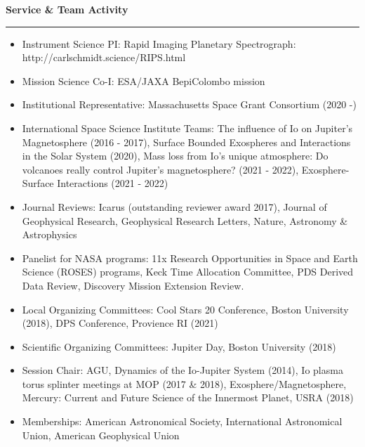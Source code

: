 \documentclass[12pt]{report}
\begin{document}
\noindent\bf{Service \& Team Activity}\rm \hspace*{\fill} \\
\rule{\textwidth}{1pt}
\begin{itemize} \itemsep -2pt %
  \item Instrument Science PI: Rapid Imaging Planetary Spectrograph: http://carlschmidt.science/RIPS.html
  \item Mission Science Co-I: ESA/JAXA BepiColombo mission
  \item Institutional Representative: Massachusetts Space Grant Consortium (2020 -)
  \item International Space Science Institute Teams: The influence of Io on Jupiter's Magnetosphere (2016 - 2017), Surface Bounded Exospheres and Interactions in the Solar System (2020), Mass loss from Io’s unique atmosphere: Do volcanoes really control Jupiter’s magnetosphere? (2021 - 2022), Exosphere-Surface Interactions (2021 - 2022)
  \item Journal Reviews: Icarus (outstanding reviewer award 2017), Journal of Geophysical Research, Geophysical Research Letters, Nature, Astronomy \& Astrophysics
  \item Panelist for NASA programs: 11x Research Opportunities in Space and Earth Science (ROSES) programs, Keck Time Allocation Committee, PDS Derived Data Review, Discovery Mission Extension Review.
  \item Local Organizing Committees: Cool Stars 20 Conference, Boston University (2018), DPS Conference, Provience RI (2021)
  \item Scientific Organizing Committees: Jupiter Day, Boston University (2018)
  \item Session Chair: AGU, Dynamics of the Io-Jupiter System (2014), Io plasma torus splinter meetings at MOP (2017 \& 2018), Exosphere/Magnetosphere, Mercury: Current and Future Science of the Innermost Planet, USRA (2018)
  \item Memberships: American Astronomical Society, 	International Astronomical Union, American Geophysical Union
\end{itemize}
\vspace{2 mm}
\end{document}
